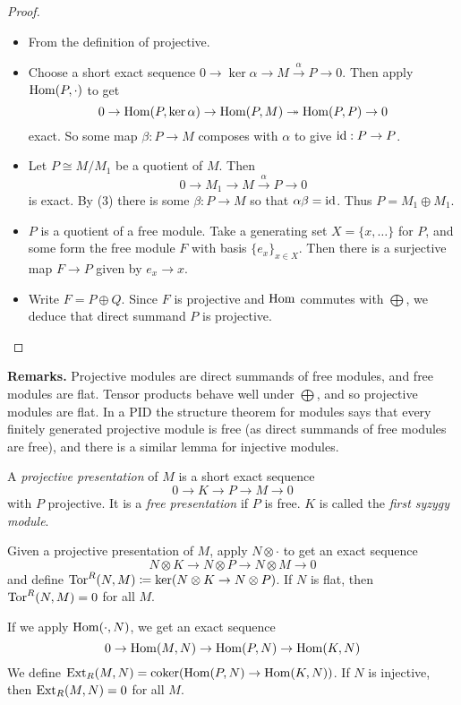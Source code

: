 \documentclass[10pt,a4paper]{article}
\begin{document}
\begin{proof}\hspace*{0cm}
  \begin{itemize}
    \item[\imp{1}{2}] From the definition of projective.
    \item[\imp{2}{3}] Choose a short exact sequence $0 \to \ker \alpha \to M \xrightarrow{\alpha} P \to 0$. Then apply $\operatorname{Hom}(P, \cdot)$ to get
    \[0 \to \operatorname{Hom}(P, \ker \alpha) \to \operatorname{Hom}(P, M) \twoheadrightarrow \operatorname{Hom}(P, P) \to 0\]
    exact. So some map $\beta: P \to M$ composes with $\alpha$ to give $\operatorname{id}:P \to P$.
    \item[\imp{3}{4}] Let $P \cong M/M_1$ be a quotient of $M$. Then
    \[0 \to M_1 \to M \xrightarrow{\alpha} P \to 0\]
    is exact. By (3) there is some $\beta: P \to M$ so that $\alpha \beta = \operatorname{id}$. Thus $P = M_1 \oplus M_1$.
    \item[\imp{4}{5}] $P$ is a quotient of a free module. Take a generating set $X = \{x,\ldots\}$ for $P$, and some form the free module $F$ with basis $\{e_x\}_{x \in X}$. Then there is a surjective map $F \to P$ given by $e_x \to x$.
    \item[\imp{5}{1}] Write $F = P \oplus Q$. Since $F$ is projective and $\operatorname{Hom}$ commutes with $\bigoplus$, we deduce that direct summand $P$ is projective.
  \end{itemize}
\end{proof}
\textbf{Remarks.} Projective modules are direct summands of free modules, and free modules are flat. Tensor products behave well under $\bigoplus$, and so projective modules are flat. In a PID the structure theorem for modules says that every finitely generated projective module is free (as direct summands of free modules are free), and there is a similar lemma for injective modules.
\begin{definition}
  A \emph{projective presentation} of $M$ is a short exact sequence
  \[0 \to K \to P \to M \to 0\]
  with $P$ projective. It is a \emph{free presentation} if $P$ is free. $K$ is called the \emph{first syzygy module}.
\end{definition}
\begin{definition}
  Given a projective presentation of $M$, apply $N \otimes \cdot$ to get an exact sequence
  \[N \otimes K \to N \otimes P \to N \otimes M \to 0\]
  and define $\operatorname{Tor}^R(N,M) \coloneqq \ker(N \otimes K \to N\otimes P)$. If $N$ is flat, then $\operatorname{Tor}^R(N,M) = 0$ for all $M$.

  If we apply $\operatorname{Hom}(\cdot, N)$, we get an exact sequence
  \[0 \to \operatorname{Hom}(M,N) \to \operatorname{Hom}(P,N) \to \operatorname{Hom}(K,N)\]
  We define $\operatorname{Ext}_R(M,N) = \operatorname{coker}(\operatorname{Hom}(P,N) \to \operatorname{Hom}(K,N))$. If $N$ is injective, then $\operatorname{Ext}_R(M,N) = 0$ for all $M$.
\end{definition}
\end{document}
